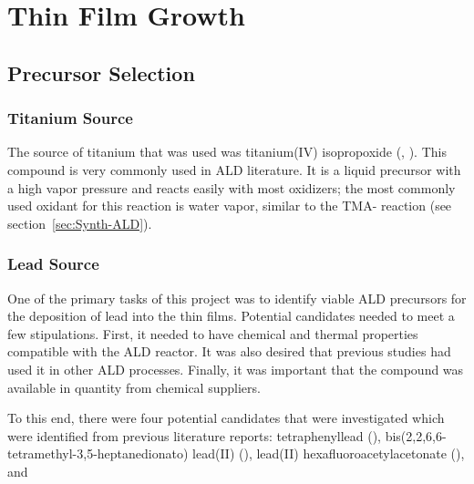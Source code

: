 \chapter{Thin Film Growth}
\label{ch:SampFab}
\thispagestyle{empty}



\section{Precursor Selection}
\label{sec:SampFab-Precursors}

\lipsum

\subsection{Titanium Source}

The source of titanium that was used was titanium(IV) isopropoxide (\TiOiPr{}, ). This compound is very commonly used in ALD literature.\cite{cianci_atomic_2012,tallarida_growth_2011,lehnert_plasma_2012,cleveland_role_2012,kubrin_stacking_2012,lee_emph-situ_2012} It is a liquid precursor with a high vapor pressure and reacts easily with most oxidizers; the most commonly used oxidant for this reaction is water vapor, similar to the TMA- reaction (see section~\vref{sec:Synth-ALD}). 

\subsection{Lead Source}

One of the primary tasks of this project was to identify viable ALD precursors for the deposition of lead into the thin films. Potential candidates needed to meet a few stipulations. First, it needed to have chemical and thermal properties compatible with the ALD reactor. It was also desired that previous studies had used it in other ALD processes. Finally, it was important that the compound was available in quantity from chemical suppliers. 

To this end, there were four potential candidates that were investigated which were identified from previous literature reports: tetraphenyllead (), bis(2,2,6,6-tetramethyl-3,5-heptanedionato) lead(II) (), lead(II) hexafluoroacetylacetonate (), and  

